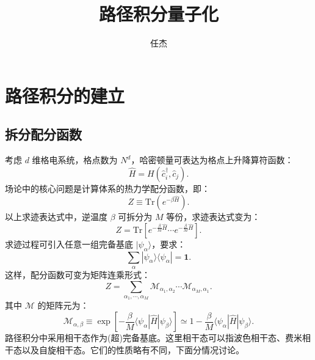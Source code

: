 \documentclass[UTF8]{ctexart}
\def\Tr{\mathrm{Tr}}
\begin{document}
\title{路径积分量子化}
\author{任杰}
\date{}

\maketitle

\section*{路径积分的建立}
\subsection*{拆分配分函数}
\noindent 
考虑 $d$ 维格电系统，格点数为 $N^d$，哈密顿量可表达为格点上升降算符函数：
\begin{equation}
	\hat H = H(\hat c_i^\dagger, \hat c_j).
\end{equation}
场论中的核心问题是计算体系的热力学配分函数，即：
\begin{equation}
	Z \equiv \Tr(e^{-\beta \hat H} ).
\end{equation}
以上求迹表达式中，逆温度 $\beta$ 可拆分为 $M$ 等份，求迹表达式变为：
\begin{equation}
	Z = \Tr \left[e^{-\frac{\beta}{M}\hat H} \cdots e^{-\frac{\beta}{M}\hat H} \right].
\end{equation}
求迹过程可引入任意一组完备基底 $|\psi_\alpha \rangle $，要求：
\begin{equation}
	\sum_{\alpha} |\psi_\alpha \rangle\langle \psi_\alpha | = \bm 1.
\end{equation}
这样，配分函数可变为矩阵连乘形式：
\begin{equation}
	Z = \sum_{\alpha_1,\cdots, \alpha_M} \mathcal M_{\alpha_1,\alpha_2} \cdots \mathcal M_{\alpha_M,\alpha_1}.
\end{equation}
其中 $\mathcal M$ 的矩阵元为：
\begin{equation}
	\mathcal M_{\alpha,\beta} \equiv 
	\exp \left[ - \frac{\beta}{M} \langle\psi_\alpha| \hat H |\psi_\beta \rangle \right]
	\simeq 1- \frac{\beta}{M} \langle\psi_\alpha| \hat H |\psi_\beta \rangle.
\end{equation}
路径积分中采用相干态作为(超)完备基底。这里相干态可以指波色相干态、费米相干态以及自旋相干态。它们的性质略有不同，下面分情况讨论。
\end{document}
